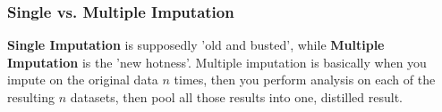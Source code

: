 \documentclass[english, 10pt]{article}
\begin{document}
\subsubsection{Single vs. Multiple Imputation}

\textbf{Single Imputation} is supposedly 'old and busted', while \textbf{Multiple Imputation} is the 'new hotness'. Multiple imputation is basically when you impute on the original data $n$ times, then you perform analysis on each of the resulting $n$ datasets, then pool all those results into one, distilled result.\\\\

{
\centering




\begin{tikzpicture}[x=0.75pt,y=0.75pt,yscale=-1,xscale=1]


\end{tikzpicture}}
\end{document}

